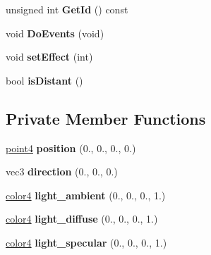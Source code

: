 \begin{DoxyCompactItemize}
\item 
\hypertarget{class_light_source_a6550cce41793d199f9eb61196d85afaa}{unsigned int {\bfseries Get\-Id} () const }\label{class_light_source_a6550cce41793d199f9eb61196d85afaa}

\item 
\hypertarget{class_light_source_a8b565d411a56940055ec3f07a401a856}{void {\bfseries Do\-Events} (void)}\label{class_light_source_a8b565d411a56940055ec3f07a401a856}

\item 
\hypertarget{class_light_source_a06c1f646e7d2ca223ab3627c1f713964}{void {\bfseries set\-Effect} (int)}\label{class_light_source_a06c1f646e7d2ca223ab3627c1f713964}

\item 
\hypertarget{class_light_source_a92e30783c70ada9adc44bb4de4d97cac}{bool {\bfseries is\-Distant} ()}\label{class_light_source_a92e30783c70ada9adc44bb4de4d97cac}

\end{DoxyCompactItemize}
\subsection*{Private Member Functions}
\begin{DoxyCompactItemize}
\item 
\hypertarget{class_light_source_a5a3061b9a67e38d53d0622619dded8a8}{\hyperlink{struct_angel_1_1vec4}{point4} {\bfseries position} (0., 0., 0., 0.)}\label{class_light_source_a5a3061b9a67e38d53d0622619dded8a8}

\item 
\hypertarget{class_light_source_ad5cab1330e90020c38721a71c75c1752}{vec3 {\bfseries direction} (0., 0., 0.)}\label{class_light_source_ad5cab1330e90020c38721a71c75c1752}

\item 
\hypertarget{class_light_source_ad65704b2f5a52df86844ebef4b1cf58f}{\hyperlink{struct_angel_1_1vec4}{color4} {\bfseries light\-\_\-ambient} (0., 0., 0., 1.)}\label{class_light_source_ad65704b2f5a52df86844ebef4b1cf58f}

\item 
\hypertarget{class_light_source_a12eba5ce9b94a0ef5062b21382317871}{\hyperlink{struct_angel_1_1vec4}{color4} {\bfseries light\-\_\-diffuse} (0., 0., 0., 1.)}\label{class_light_source_a12eba5ce9b94a0ef5062b21382317871}

\item 
\hypertarget{class_light_source_a7fffcad63f4e3cb143ef2f02d1d9178c}{\hyperlink{struct_angel_1_1vec4}{color4} {\bfseries light\-\_\-specular} (0., 0., 0., 1.)}\label{class_light_source_a7fffcad63f4e3cb143ef2f02d1d9178c}

\end{DoxyCompactItemize}
